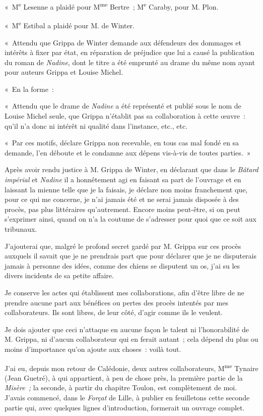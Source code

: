 \documentclass[french,twoside]{book} %
\begin{document}
\noindent « M\textsuperscript{e} Lesenne a plaidé pour M\textsuperscript{me} Bertre ; M\textsuperscript{e} Caraby, pour M. Plon.\par
« M\textsuperscript{e} Estibal a plaidé pour M. de Winter.\par
« Attendu que Grippa de Winter demande aux défendeurs des dommages et intérêts à fixer par état, en réparation de préjudice que lui a causé la publication du roman de \emph{Nadine}, dont le titre a été emprunté au drame du même nom ayant pour auteurs Grippa et Louise Michel.\par
« En la forme :\par
« Attendu que le drame de \emph{Nadine} a été représenté et publié sous le nom de Louise Michel seule, que Grippa n’établit pas sa collaboration à cette œuvre : qu’il n’a donc ni intérêt ni qualité dans l’instance, etc., etc.\par
 « Par ces motifs, déclare Grippa non recevable, en tous cas mal fondé en sa demande, l’en déboute et le condamne aux dépens vis-à-vis de toutes parties. »\par
Après avoir rendu justice à M. Grippa de Winter, en déclarant que dans le \emph{Bâtard impérial} et \emph{Nadine} il a honnêtement agi en faisant sa part de l’ouvrage et en laissant la mienne telle que je la faisais, je déclare non moins franchement que, pour ce qui me concerne, je n’ai jamais été et ne serai jamais disposée à des procès, pas plus littéraires qu’autrement. Encore moins peut-être, si on peut s’exprimer ainsi, quand on n’a la coutume de s’adresser pour quoi que ce soit aux tribunaux.\par
J’ajouterai que, malgré le profond secret gardé par M. Grippa sur ces procès auxquels il savait que je ne prendrais part que pour déclarer que je ne disputerais jamais à personne des idées, comme des chiens se disputent un os, j’ai su les divers incidents de sa petite affaire.\par
Je conserve les actes qui établissent mes collaborations, afin d’être libre de ne prendre aucune part aux bénéfices ou pertes des procès intentés par mes collaborateurs. Ils sont libres, de leur côté, d’agir comme ils le veulent.\par
Je dois ajouter que ceci n’attaque en aucune  façon le talent ni l’honorabilité de M. Grippa, ni d’aucun collaborateur qui en ferait autant ; cela dépend du plus ou moins d’importance qu’on ajoute aux choses : voilà tout.\par
J’ai eu, depuis mon retour de Calédonie, deux autres collaborateurs, M\textsuperscript{me} Tynaire (Jean Guetré), à qui appartient, à peu de chose près, la première partie de la \emph{Misère ;} la seconde, à partir du chapitre Toulon, est complètement de moi. J’avais commencé, dans le \emph{Forçat} de Lille, à publier en feuilletons cette seconde partie qui, avec quelques lignes d’introduction, formerait un ouvrage complet.\par
\end{document}
